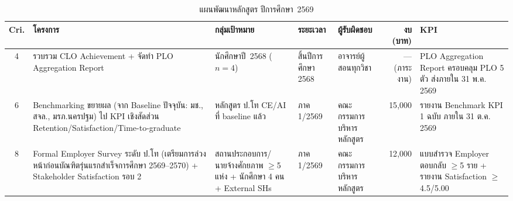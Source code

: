\begin{table}[H]
  \centering
  \caption{แผนพัฒนาหลักสูตร ปีการศึกษา~2569}
  \label{tbl:action_plan}
  \begingroup
  \footnotesize
  \setlength{\tabcolsep}{3pt}
  \renewcommand{\arraystretch}{1.2}
  \begin{tabularx}{\linewidth}{|c|>{\raggedright\arraybackslash}X|>{\raggedright\arraybackslash}X|l|>{\raggedright\arraybackslash}X|r|>{\raggedright\arraybackslash}X|}
    \hline
    \textbf{Cri.} & \textbf{โครงการ} & \textbf{กลุ่มเป้าหมาย} & \textbf{ระยะเวลา} & \textbf{ผู้รับผิดชอบ} & \textbf{งบ (บาท)} & \textbf{KPI} \\
    \hline
    4 & รวบรวม CLO Achievement + จัดทำ PLO Aggregation Report & นักศึกษาปี~2568 ($n=4$) & สิ้นปีการศึกษา 2568 & อาจารย์ผู้สอนทุกวิชา & --- (ภาระงาน) & PLO Aggregation Report ครอบคลุม PLO 5 ตัว ส่งภายใน 31 พ.ค. 2569 \\
    \hline
    6 & Benchmarking ขยายผล (จาก Baseline ปัจจุบัน: มช., สจล., มรภ.นครปฐม) ไป KPI เชิงสัดส่วน Retention/Satisfaction/Time-to-graduate & 3 หลักสูตร ป.โท CE/AI ที่ baseline แล้ว & ภาค 1/2569 & คณะกรรมการบริหารหลักสูตร & 15{,}000 & รายงาน Benchmark KPI 1 ฉบับ ภายใน 31 ต.ค. 2569 \\
    \hline
    8 & Formal Employer Survey ระดับ ป.โท (เตรียมการล่วงหน้าก่อนบัณฑิตรุ่นแรกสำเร็จการศึกษา 2569--2570) + Stakeholder Satisfaction รอบ 2 & สถานประกอบการ/นายจ้างศักยภาพ $\geq$5 แห่ง + นักศึกษา 4 คน + External SHs & ภาค 1/2569 & คณะกรรมการบริหารหลักสูตร & 12{,}000 & แบบสำรวจ Employer ตอบกลับ $\geq$5 ราย + รายงาน Satisfaction $\geq$4.5/5.00 \\
    \hline
  \end{tabularx}
  \endgroup
\end{table}

